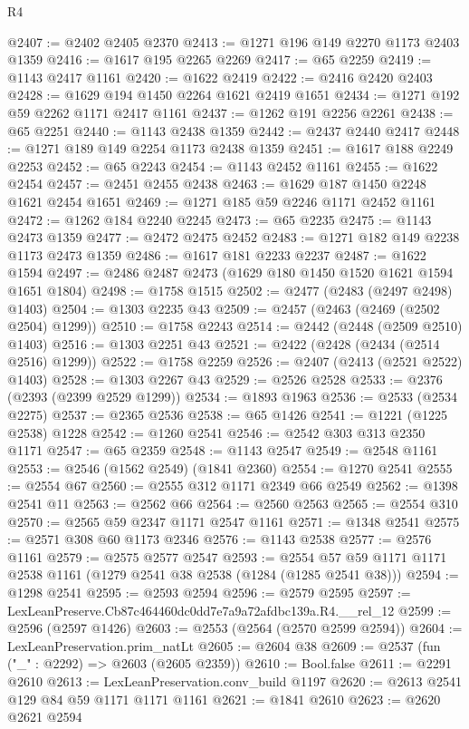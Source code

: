 \begin{lexlean}{R4}
\begin{coremodule}
@2407 := @2402 @2405 @2370
@2413 := @1271 @196 @149 @2270 @1173 @2403 @1359
@2416 := @1617 @195 @2265 @2269
@2417 := @65 @2259
@2419 := @1143 @2417 @1161
@2420 := @1622 @2419
@2422 := @2416 @2420 @2403
@2428 := @1629 @194 @1450 @2264 @1621 @2419 @1651
@2434 := @1271 @192 @59 @2262 @1171 @2417 @1161
@2437 := @1262 @191 @2256 @2261
@2438 := @65 @2251
@2440 := @1143 @2438 @1359
@2442 := @2437 @2440 @2417
@2448 := @1271 @189 @149 @2254 @1173 @2438 @1359
@2451 := @1617 @188 @2249 @2253
@2452 := @65 @2243
@2454 := @1143 @2452 @1161
@2455 := @1622 @2454
@2457 := @2451 @2455 @2438
@2463 := @1629 @187 @1450 @2248 @1621 @2454 @1651
@2469 := @1271 @185 @59 @2246 @1171 @2452 @1161
@2472 := @1262 @184 @2240 @2245
@2473 := @65 @2235
@2475 := @1143 @2473 @1359
@2477 := @2472 @2475 @2452
@2483 := @1271 @182 @149 @2238 @1173 @2473 @1359
@2486 := @1617 @181 @2233 @2237
@2487 := @1622 @1594
@2497 := @2486 @2487 @2473 (@1629 @180 @1450 @1520 @1621 @1594 @1651 @1804)
@2498 := @1758 @1515
@2502 := @2477 (@2483 (@2497 @2498) @1403)
@2504 := @1303 @2235 @43
@2509 := @2457 (@2463 (@2469 (@2502 @2504) @1299))
@2510 := @1758 @2243
@2514 := @2442 (@2448 (@2509 @2510) @1403)
@2516 := @1303 @2251 @43
@2521 := @2422 (@2428 (@2434 (@2514 @2516) @1299))
@2522 := @1758 @2259
@2526 := @2407 (@2413 (@2521 @2522) @1403)
@2528 := @1303 @2267 @43
@2529 := @2526 @2528
@2533 := @2376 (@2393 (@2399 @2529 @1299))
@2534 := @1893 @1963
@2536 := @2533 (@2534 @2275)
@2537 := @2365 @2536
@2538 := @65 @1426
@2541 := @1221 (@1225 @2538) @1228
@2542 := @1260 @2541
@2546 := @2542 @303 @313 @2350 @1171
@2547 := @65 @2359
@2548 := @1143 @2547
@2549 := @2548 @1161
@2553 := @2546 (@1562 @2549) (@1841 @2360)
@2554 := @1270 @2541
@2555 := @2554 @67
@2560 := @2555 @312 @1171 @2349 @66 @2549
@2562 := @1398 @2541 @11
@2563 := @2562 @66
@2564 := @2560 @2563
@2565 := @2554 @310
@2570 := @2565 @59 @2347 @1171 @2547 @1161
@2571 := @1348 @2541
@2575 := @2571 @308 @60 @1173 @2346
@2576 := @1143 @2538
@2577 := @2576 @1161
@2579 := @2575 @2577 @2547
@2593 := @2554 @57 @59 @1171 @1171 @2538 @1161 (@1279 @2541 @38 @2538 (@1284 (@1285 @2541 @38)))
@2594 := @1298 @2541
@2595 := @2593 @2594
@2596 := @2579 @2595
@2597 := LexLeanPreserve.Cb87c464460dc0dd7e7a9a72afdbc139a.R4.__rel_12
@2599 := @2596 (@2597 @1426)
@2603 := @2553 (@2564 (@2570 @2599 @2594))
@2604 := LexLeanPreservation.prim_natLt
@2605 := @2604 @38
@2609 := @2537 (fun ("_" : @2292) => @2603 (@2605 @2359))
@2610 := Bool.false
@2611 := @2291 @2610
@2613 := LexLeanPreservation.conv_build @1197
@2620 := @2613 @2541 @129 @84 @59 @1171 @1171 @1161
@2621 := @1841 @2610
@2623 := @2620 @2621 @2594

\end{coremodule}
\end{lexlean}
